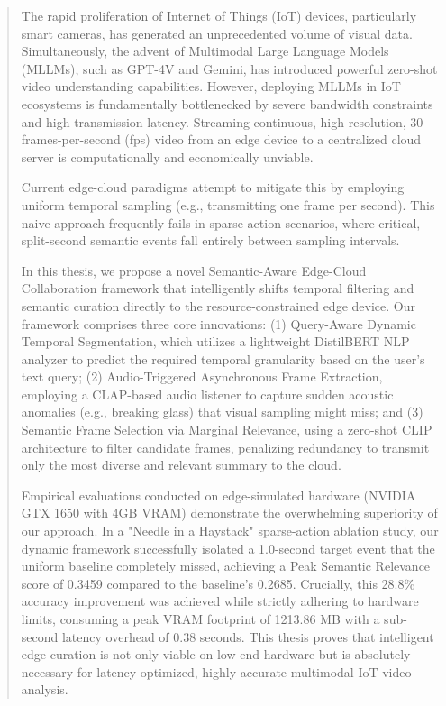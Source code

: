 \documentclass[12pt, a4paper]{report}
\begin{document}
\begin{abstract}
The rapid proliferation of Internet of Things (IoT) devices, particularly smart cameras, has generated an unprecedented volume of visual data. Simultaneously, the advent of Multimodal Large Language Models (MLLMs), such as GPT-4V and Gemini, has introduced powerful zero-shot video understanding capabilities. However, deploying MLLMs in IoT ecosystems is fundamentally bottlenecked by severe bandwidth constraints and high transmission latency. Streaming continuous, high-resolution, 30-frames-per-second (fps) video from an edge device to a centralized cloud server is computationally and economically unviable. 

Current edge-cloud paradigms attempt to mitigate this by employing uniform temporal sampling (e.g., transmitting one frame per second). This naive approach frequently fails in sparse-action scenarios, where critical, split-second semantic events fall entirely between sampling intervals. 

In this thesis, we propose a novel Semantic-Aware Edge-Cloud Collaboration framework that intelligently shifts temporal filtering and semantic curation directly to the resource-constrained edge device. Our framework comprises three core innovations: (1) Query-Aware Dynamic Temporal Segmentation, which utilizes a lightweight DistilBERT NLP analyzer to predict the required temporal granularity based on the user's text query; (2) Audio-Triggered Asynchronous Frame Extraction, employing a CLAP-based audio listener to capture sudden acoustic anomalies (e.g., breaking glass) that visual sampling might miss; and (3) Semantic Frame Selection via Marginal Relevance, using a zero-shot CLIP architecture to filter candidate frames, penalizing redundancy to transmit only the most diverse and relevant summary to the cloud.

Empirical evaluations conducted on edge-simulated hardware (NVIDIA GTX 1650 with 4GB VRAM) demonstrate the overwhelming superiority of our approach. In a "Needle in a Haystack" sparse-action ablation study, our dynamic framework successfully isolated a 1.0-second target event that the uniform baseline completely missed, achieving a Peak Semantic Relevance score of 0.3459 compared to the baseline's 0.2685. Crucially, this 28.8\% accuracy improvement was achieved while strictly adhering to hardware limits, consuming a peak VRAM footprint of 1213.86 MB with a sub-second latency overhead of 0.38 seconds. This thesis proves that intelligent edge-curation is not only viable on low-end hardware but is absolutely necessary for latency-optimized, highly accurate multimodal IoT video analysis.
\end{abstract}
\newpage
\end{document}
